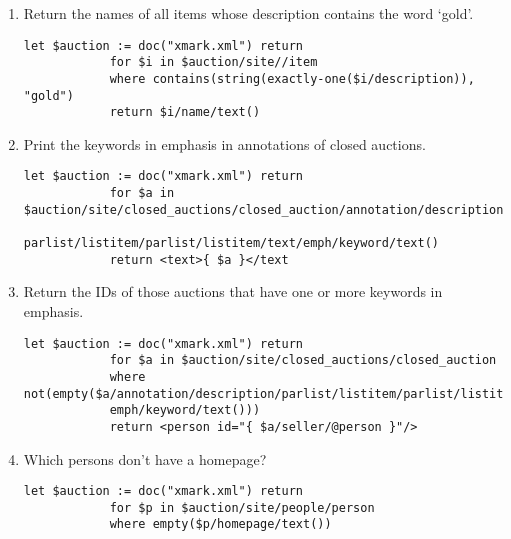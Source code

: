 \begin{enumerate}[label=Q\arabic*.]
		\begin{lstlisting}[style=XQuery]
			let $auction := doc("auction.xml") return
			for $p in $auction/site/people/person
			let $l :=
			for $i in $auction/site/open_auctions/open_auction/initial
			where $p/profile/@income > 5000 * exactly-one($i/text())
			return $i
			where $p/profile/@income > 50000
			return <items person="{$p/profile/@income}">{count($l)}</items>
		\end{fakeXML}	
		\item %13
			List the names of items registered in Australia along with their descriptions.
		\begin{lstlisting}[style=XQuery]
			let $auction := doc("xmark.xml") return
			for $i in $auction/site/regions/australia/item
			return <item name="{ $i/name/text() }">{ $i/description }</item>
		\end{lstlisting}	
		\item %
			Return the names of all items whose description contains the word ‘gold’.
		\begin{lstlisting}[style=XQuery]
			let $auction := doc("xmark.xml") return
			for $i in $auction/site//item
			where contains(string(exactly-one($i/description)), "gold")
			return $i/name/text()
		\end{lstlisting}	
		\item %
			Print the keywords in emphasis in annotations of closed auctions.
		\begin{lstlisting}[style=XQuery]
			let $auction := doc("xmark.xml") return
			for $a in $auction/site/closed_auctions/closed_auction/annotation/description/
			parlist/listitem/parlist/listitem/text/emph/keyword/text()
			return <text>{ $a }</text
		\end{lstlisting}	
		\item %
			Return the IDs of those auctions that have one or more keywords in emphasis.
		\begin{lstlisting}[style=XQuery]
			let $auction := doc("xmark.xml") return
			for $a in $auction/site/closed_auctions/closed_auction
			where not(empty($a/annotation/description/parlist/listitem/parlist/listitem/text/
			emph/keyword/text()))
			return <person id="{ $a/seller/@person }"/>
		\end{lstlisting}	
		\item %
			Which persons don’t have a homepage?
		\begin{lstlisting}[style=XQuery]
			let $auction := doc("xmark.xml") return
			for $p in $auction/site/people/person
			where empty($p/homepage/text())

\end{lstlisting}
\end{enumerate}
